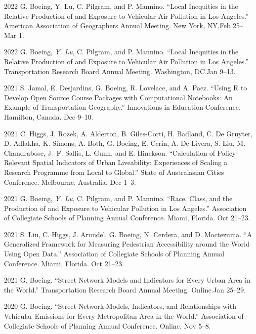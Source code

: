 \documentclass[12pt,letterpaper]{report}
\begin{document}
\begin{tablist}
        \item[2022] \tab{}G. Boeing, Y. Lu, C. Pilgram, and P. Mannino. \enquote{Local Inequities in the Relative Production of and Exposure to Vehicular Air Pollution in Los Angeles.} American Association of Geographers Annual Meeting. New York, NY.\@ Feb 25--Mar 1.

        \item[2022] \tab{}G. Boeing, \textit{Y. Lu}, C. Pilgram, and P. Mannino. \enquote{Local Inequities in the Relative Production of and Exposure to Vehicular Air Pollution in Los Angeles.} Transportation Research Board Annual Meeting. Washington, DC.\@ Jan 9--13.

        \item[2021] \tab{}S. Jamal, E. Desjardins, G. Boeing, R. Lovelace, and A. Paez. \enquote{Using R to Develop Open Source Course Packages with Computational Notebooks: An Example of Transportation Geography.} Innovations in Education Conference. Hamilton, Canada. Dec 9--10.

        \item[2021] \tab{}C. Higgs, J. Rozek, A. Alderton, B. Giles-Corti, H. Badland, C. De Gruyter, D. Adlakha, K. Simons, A. Both, G. Boeing, E. Cerin, A. De Livera, S. Liu, M. Chandrabose, J.~F. Sallis, L. Gunn, and E. Hinckson. \enquote{Calculation of Policy-Relevant Spatial Indicators of Urban Liveability: Experiences of Scaling a Research Programme from Local to Global.} State of Australasian Cities Conference. Melbourne, Australia. Dec 1--3.

        \item[2021] \tab{}G. Boeing, \textit{Y. Lu}, C. Pilgram, and P. Mannino. \enquote{Race, Class, and the Production of and Exposure to Vehicular Pollution in Los Angeles.} Association of Collegiate Schools of Planning Annual Conference. Miami, Florida. Oct 21--23.

        \item[2021] \tab{}S. Liu, C. Higgs, J. Arundel, G. Boeing, N. Cerdera, and D. Moctezuma. \enquote{A Generalized Framework for Measuring Pedestrian Accessibility around the World Using Open Data.} Association of Collegiate Schools of Planning Annual Conference. Miami, Florida. Oct 21--23.

        \item[2021] \tab{}G. Boeing. \enquote{Street Network Models and Indicators for Every Urban Area in the World.} Transportation Research Board Annual Meeting. Online.\@ Jan 25--29.

        \item[2020] \tab{}G. Boeing. \enquote{Street Network Models, Indicators, and Relationships with Vehicular Emissions for Every Metropolitan Area in the World.} Association of Collegiate Schools of Planning Annual Conference. Online. Nov 5--8.


\end{tablist}
\end{document}

